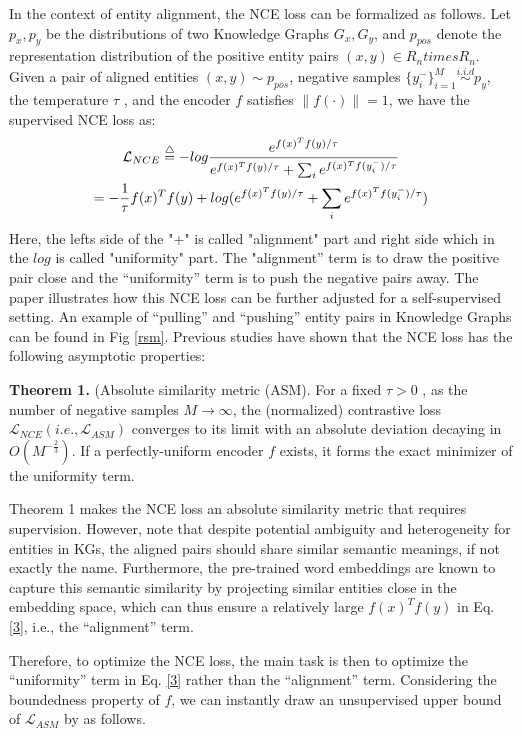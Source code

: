 \documentclass[sigconf]{acmart}
\begin{document}
{In the context of entity alignment, the NCE loss can be formalized as follows. Let $p_x, p_y$ be the distributions of two Knowledge Graphs $G_x, G_y$, and $p_{pos}$ denote the representation distribution of the positive entity pairs $(x, y) \in R_n times R_n$. Given a pair of aligned entities $(x, y) \sim p_{pos}$, negative samples $\{y^{-}_i\}_{i=1}^M \overset{i.i.d}{\sim}  p_y$, the temperature $\tau$ , and the encoder $f$ satisfies $\left \| f(\cdot) \right \|=1  $, we have the supervised NCE loss as:
\begin{gather}\label{3}
\mathcal{L}_{NCE}\overset{\bigtriangleup }{=}-log\frac{e^{f(x)^Tf(y)/\tau}}{e^{f(x)^Tf(y)/\tau}+\sum _ie^{f(x)^Tf(y_i^{-})/\tau}} \notag \\
=-\frac{1}{\tau}f(x)^Tf(y)+log(e^{f(x)^Tf(y)/\tau}+\sum_ie^{f(x)^Tf(y_i^{-})/\tau})   
\end{gather}
Here, the lefts side of the "$+$" is called "alignment" part and right side which in the $log$ is called "uniformity" part. The "alignment” term is to draw the positive pair close and the “uniformity” term is to push the negative pairs away. The paper illustrates how this NCE loss can be further adjusted for a self-supervised setting. An example of “pulling” and “pushing” entity pairs in Knowledge Graphs can be found in Fig \ref{rsm}. Previous studies have shown that the NCE loss has the following asymptotic properties:

\textbf{Theorem 1.} (Absolute similarity metric (ASM). For a fixed $\tau >0$ , as the number of negative samples $M \to \infty $, the (normalized) contrastive loss $\mathcal{L}_{NCE} (i.e., \mathcal{L}_{ASM})$ converges to its limit with an absolute deviation decaying in $O(M^{-\frac{2}{3}})$. If a perfectly-uniform encoder $f$ exists, it forms the exact minimizer of the uniformity term.

Theorem 1 makes the NCE loss an absolute similarity metric that requires supervision. However, note that despite potential ambiguity and heterogeneity for entities in KGs, the aligned pairs should share similar semantic meanings, if not exactly the name. Furthermore, the pre-trained word embeddings are known to capture this semantic similarity by projecting similar entities close in the embedding space, which can thus ensure a relatively large $f(x)^T f(y)$ in Eq. \ref{3}, i.e., the “alignment” term. 

Therefore, to optimize the NCE loss, the main task is then to optimize the “uniformity” term in Eq. \ref{3} rather than the “alignment” term. Considering the boundedness property of $f$, we can instantly draw an unsupervised upper bound of $\mathcal{L}_{ASM}$ by as follows.

}
\end{document}
